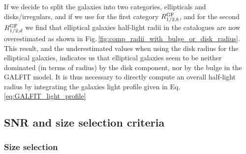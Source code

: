 If we decide to split the galaxies into two categories, ellipticals and disks/irregulars, and if we use for the first category $R_{1/2 , b}^{\rm{GF}}$, and for the second $R_{1/2 , d}^{\rm{GF}}$ we find that elliptical galaxies half-light radii in the catalogues are now overestimated as shown in Fig.\,\ref{fig:comp_radii_with_bulge_or_disk_radius}. This result, and the underestimated values when using the disk radius for the elliptical galaxies, indicates us that elliptical galaxies seem to be neither dominated (in terms of radius) by the disk component, nor by the bulge in the GALFIT model. It is thus necessary to directly compute an overall half-light radius by integrating the galaxies light profile given in Eq.\,\ref{eq:GALFIT_light_profile}


























\subsection{SNR and size selection criteria}

\subsubsection{Size selection}

